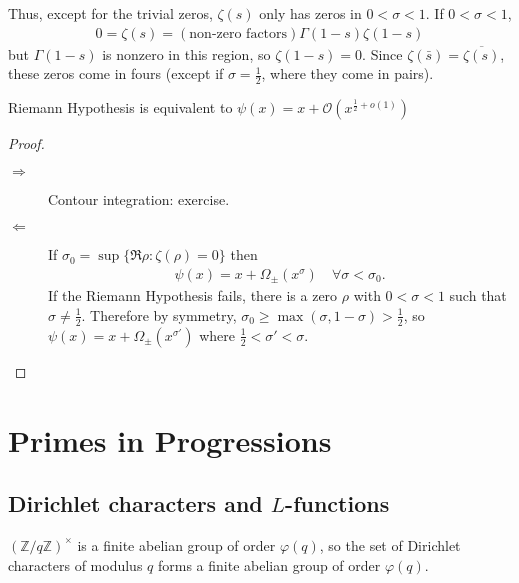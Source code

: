 \documentclass{article}
\newcommand{\1}{\mathbbm{1}}
\newcommand{\named}[1]{\textbf{#1}\index{#1}}
\newcommand{\bigO}{\mathcal{O}}
\begin{document}
Thus, except for the trivial zeros, $\zeta(s)$ only has zeros in $0 < \sigma < 1$. If $0 < \sigma < 1$,
\begin{align*}
  0 = \zeta(s) = (\text{non-zero factors}) \Gamma(1-s) \zeta(1-s)
\end{align*}
but $\Gamma(1-s)$ is nonzero in this region, so $\zeta(1-s) = 0$.
Since $\zeta(\bar{s}) = \overline{\zeta(s)}$, these zeros come in fours (except if $\sigma = \frac{1}{2}$, where they come in pairs).
\begin{thm}
  Riemann Hypothesis is equivalent to $\psi(x) = x + \bigO(x^{\frac 12 + o(1)})$
\end{thm}
\begin{proof}\leavevmode
  \begin{description}
    \item[$\Rightarrow$] Contour integration: exercise.
    \item [$\Leftarrow$] If $\sigma_0 = \sup\{\Re \rho : \zeta(\rho)=0\}$ then
      \begin{align*}
        \psi(x) = x + \Omega_{\pm}(x^\sigma) \quad \forall \sigma < \sigma_0.
      \end{align*}
      If the Riemann Hypothesis fails, there is a zero $\rho$ with $0 < \sigma < 1$ such that $\sigma \neq \frac 12$. Therefore by symmetry, $\sigma_0 \geq \max(\sigma,1-\sigma) > \frac{1}{2}$, so $\psi(x) = x + \Omega_{\pm}(x^{\sigma'})$ where $\frac{1}{2} < \sigma' < \sigma$.
  \end{description}
\end{proof}

\clearpage
\section{Primes in Progressions}
\subsection{Dirichlet characters and \texorpdfstring{$L$}{L}-functions}
$(\mathbb{Z}/q\mathbb{Z})^\times$ is a finite abelian group of order $\varphi(q)$, so the set of Dirichlet characters of modulus $q$ forms a finite abelian group of order $\varphi(q)$.
\end{document}
